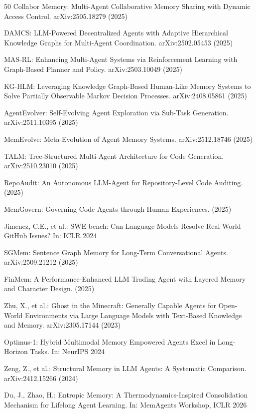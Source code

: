 \documentclass[hf]{ceurart}
\begin{document}
\begin{thebibliography}{50}
Collabor Memory: Multi-Agent Collaborative Memory Sharing with
Dynamic Access Control. arXiv:2505.18279 (2025)

DAMCS: LLM-Powered Decentralized Agents with Adaptive Hierarchical
Knowledge Graphs for Multi-Agent Coordination. arXiv:2502.05453 (2025)

MAS-RL: Enhancing Multi-Agent Systems via Reinforcement Learning with
Graph-Based Planner and Policy. arXiv:2503.10049 (2025)

KG-HLM: Leveraging Knowledge Graph-Based Human-Like Memory Systems
to Solve Partially Observable Markov Decision Processes.
arXiv:2408.05861 (2025)

AgentEvolver: Self-Evolving Agent Exploration via Sub-Task Generation.
arXiv:2511.10395 (2025)

MemEvolve: Meta-Evolution of Agent Memory Systems.
arXiv:2512.18746 (2025)

TALM: Tree-Structured Multi-Agent Architecture for Code Generation.
arXiv:2510.23010 (2025)

RepoAudit: An Autonomous LLM-Agent for Repository-Level Code Auditing.
(2025)

MemGovern: Governing Code Agents through Human Experiences.
(2025)

Jimenez, C.E., et al.: SWE-bench: Can Language Models Resolve
Real-World GitHub Issues? In: ICLR 2024

SGMem: Sentence Graph Memory for Long-Term Conversational Agents.
arXiv:2509.21212 (2025)

FinMem: A Performance-Enhanced LLM Trading Agent with Layered
Memory and Character Design. (2025)

Zhu, X., et al.: Ghost in the Minecraft: Generally Capable Agents
for Open-World Environments via Large Language Models with
Text-Based Knowledge and Memory. arXiv:2305.17144 (2023)

Optimus-1: Hybrid Multimodal Memory Empowered Agents Excel in
Long-Horizon Tasks. In: NeurIPS 2024

Zeng, Z., et al.: Structural Memory in LLM Agents: A Systematic
Comparison. arXiv:2412.15266 (2024)

Du, J., Zhao, H.: Entropic Memory: A Thermodynamics-Inspired
Consolidation Mechanism for Lifelong Agent Learning. In: MemAgents
Workshop, ICLR 2026


\end{thebibliography}
\end{document}
